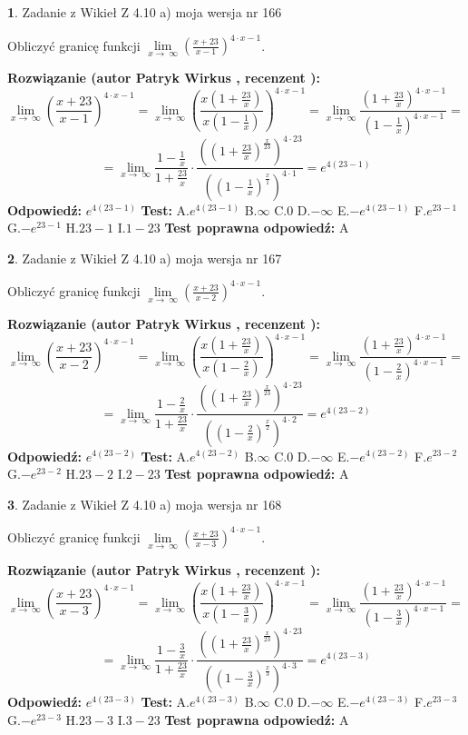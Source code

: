 \documentclass[12pt, a4paper]{article}
\theoremstyle{definition} %
\newtheorem{zad}{}
\newcommand{\zadStart}[1]{\begin{zad}#1\newline}
\newcommand{\zadStop}{\end{zad}}
\newcommand{\rozwStart}[2]{\noindent \textbf{Rozwiązanie (autor #1 , recenzent #2): }\newline}
\newcommand{\rozwStop}{\newline}
\newcommand{\odpStart}{\noindent \textbf{Odpowiedź:}\newline}
\newcommand{\odpStop}{\newline}
\newcommand{\testStart}{\noindent \textbf{Test:}\newline}
\newcommand{\testStop}{\newline}
\newcommand{\kluczStart}{\noindent \textbf{Test poprawna odpowiedź:}\newline}
\newcommand{\kluczStop}{\newline}
\begin{document}
\zadStart{Zadanie z Wikieł Z 4.10 a) moja wersja nr 166}


Obliczyć granicę funkcji  $\lim\limits_{x\to\ \infty}(\frac{x+23}{x-1})^{4\cdot x-1}$.
\zadStop
\rozwStart{Patryk Wirkus}{}
$$\lim\limits_{x\to\ \infty}(\frac{x+23}{x-1})^{4\cdot x-1} = \lim\limits_{x\to\ \infty}(\frac{x(1+\frac{23}{x})}{x(1-\frac{1}{x})})^{4\cdot x-1}=\lim\limits_{x\to\ \infty}\frac{(1+\frac{23}{x})^{4\cdot x-1}}{(1-\frac{1}{x})^{4\cdot x-1}}=$$
$$=\lim\limits_{x\to\ \infty}\frac{1-\frac{1}{x}}{1+\frac{23}{x}}\cdot\frac{((1+\frac{23}{x})^{\frac{x}{23}})^{4\cdot23}}{((1-\frac{1}{x})^{\frac{x}{1}})^{4\cdot1}}=e^{4(23-1)}$$
\rozwStop
\odpStart
$e^{4(23-1)}$
\odpStop
\testStart
A.$e^{4(23-1)}$ B.$\infty$ C.$0$ D.$-\infty$ E.$-e^{4(23-1)}$
F.$e^{23-1}$ G.$-e^{23-1}$
H.$23-1$
I.$1-23$
\testStop
\kluczStart
A
\kluczStop



\zadStart{Zadanie z Wikieł Z 4.10 a) moja wersja nr 167}


Obliczyć granicę funkcji  $\lim\limits_{x\to\ \infty}(\frac{x+23}{x-2})^{4\cdot x-1}$.
\zadStop
\rozwStart{Patryk Wirkus}{}
$$\lim\limits_{x\to\ \infty}(\frac{x+23}{x-2})^{4\cdot x-1} = \lim\limits_{x\to\ \infty}(\frac{x(1+\frac{23}{x})}{x(1-\frac{2}{x})})^{4\cdot x-1}=\lim\limits_{x\to\ \infty}\frac{(1+\frac{23}{x})^{4\cdot x-1}}{(1-\frac{2}{x})^{4\cdot x-1}}=$$
$$=\lim\limits_{x\to\ \infty}\frac{1-\frac{2}{x}}{1+\frac{23}{x}}\cdot\frac{((1+\frac{23}{x})^{\frac{x}{23}})^{4\cdot23}}{((1-\frac{2}{x})^{\frac{x}{2}})^{4\cdot2}}=e^{4(23-2)}$$
\rozwStop
\odpStart
$e^{4(23-2)}$
\odpStop
\testStart
A.$e^{4(23-2)}$ B.$\infty$ C.$0$ D.$-\infty$ E.$-e^{4(23-2)}$
F.$e^{23-2}$ G.$-e^{23-2}$
H.$23-2$
I.$2-23$
\testStop
\kluczStart
A
\kluczStop



\zadStart{Zadanie z Wikieł Z 4.10 a) moja wersja nr 168}


Obliczyć granicę funkcji  $\lim\limits_{x\to\ \infty}(\frac{x+23}{x-3})^{4\cdot x-1}$.
\zadStop
\rozwStart{Patryk Wirkus}{}
$$\lim\limits_{x\to\ \infty}(\frac{x+23}{x-3})^{4\cdot x-1} = \lim\limits_{x\to\ \infty}(\frac{x(1+\frac{23}{x})}{x(1-\frac{3}{x})})^{4\cdot x-1}=\lim\limits_{x\to\ \infty}\frac{(1+\frac{23}{x})^{4\cdot x-1}}{(1-\frac{3}{x})^{4\cdot x-1}}=$$
$$=\lim\limits_{x\to\ \infty}\frac{1-\frac{3}{x}}{1+\frac{23}{x}}\cdot\frac{((1+\frac{23}{x})^{\frac{x}{23}})^{4\cdot23}}{((1-\frac{3}{x})^{\frac{x}{3}})^{4\cdot3}}=e^{4(23-3)}$$
\rozwStop
\odpStart
$e^{4(23-3)}$
\odpStop
\testStart
A.$e^{4(23-3)}$ B.$\infty$ C.$0$ D.$-\infty$ E.$-e^{4(23-3)}$
F.$e^{23-3}$ G.$-e^{23-3}$
H.$23-3$
I.$3-23$
\testStop
\kluczStart
A
\kluczStop
\end{document}
